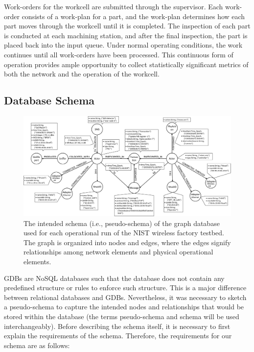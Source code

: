 Work-orders for the workcell are submitted through the supervisor. Each work-order consists of a work-plan for a part, and the work-plan determines how each part moves through the workcell until it is completed. The inspection of each part is conducted at each machining station, and after the final inspection, the part is placed back into the input queue.  Under normal operating conditions, the work continues until all work-orders have been processed.  This continuous form of operation provides ample opportunity to collect statistically significant metrics of both the network and the operation of the workcell.

\subsection{Database Schema}\label{gdbappl:sec::dbschema}

\begin{figure}
	\centering
	\includegraphics[width=\textwidth]{./chapter-gdb-appl/figures/database/graph_schema_0816.eps}
	\caption{The intended schema (i.e., pseudo-schema) of the graph database used for each operational run of the NIST wireless factory testbed.  The graph is organized into nodes and edges, where the edges signify relationships among network elements and physical operational elements.}
	\label{gdbappl:fig::database:schema}
\end{figure}

GDBs are NoSQL databases such that the database does not contain any predefined structure or rules to enforce such structure.  This is a major difference between relational databases and GDBs.  Nevertheless, it was necessary to sketch a pseudo-schema to capture the intended nodes and relationships that would be stored within the database (the terms pseudo-schema and schema will be used interchangeably). Before describing the schema itself, it is necessary to first explain the requirements of the schema.  Therefore, the requirements for our schema are as follows:

